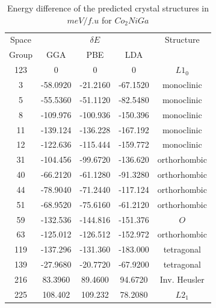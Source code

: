 \documentclass[%
preprint,
 amsmath,amssymb,
 aps,
prb,
showkeys,
]{revtex4-1}
\begin{document}
  \begin{table}
    \caption{Energy difference of the predicted crystal structures in $meV/f.u$ for $Co_2NiGa$ }
    \centering
    \setlength{\tabcolsep}{0.8cm}
    \begin{tabular}{c c c c c} 
        \hline \hline
        \multicolumn{1}{c}{Space} & \multicolumn{ 3}{c}{$\delta E$} & \multicolumn{1}{c}{Structure} \\ 
        \multicolumn{1}{c}{Group} & \multicolumn{1}{c}{GGA} & \multicolumn{1}{c}{PBE} & \multicolumn{1}{c}{LDA} &\multicolumn{1}{c}{}\\ 
        \hline
       123 & 0 & 0 & 0 & $ {L1_0}$ \\ 
       3 & -58.0920 & -21.2160& -67.1520 & monoclinic \\ 
       5 & -55.5360 & -51.1120 & -82.5480 & monoclinic \\ 
       8 & -109.976 & -100.936 & -150.396 &  monoclinic \\ 
       11 & -139.124 & -136.228 & -167.192 & monoclinic\\ 
       12 & -122.636 & -115.444 & -159.772  & monoclinic \\ 
       31 & -104.456 & -99.6720  & -136.620 & orthorhombic \\ 
       40 & -66.2120 & -61.1280 & -91.3280 & orthorhombic \\ 
       44 & -78.9040 & -71.2440    & -117.124 & orthorhombic \\ 
       51 & -68.9520 & -75.6160 & -61.2120 & orthorhombic \\ 
       59 &  -132.536 & -144.816 & -151.376 & ${O}$ \\ 
       63 & -125.012 & -126.512 & -152.972 & orthorhombic \\  
       119 &  -137.296 & -131.360  &  -183.000  & tetragonal \\ 
       139 & -27.9680 & -20.7720 & -67.9200  & tetragonal \\ 
       216 & 83.3960 & 89.4600 & 94.6720 & Inv. Heusler\\ 
       225 & 108.402 & 109.232 & 78.2080 & $L2_1$ \\ 
        \hline
      \end{tabular}
    \label{tab:minima_hopping}
    \end{table}
\end{document}
